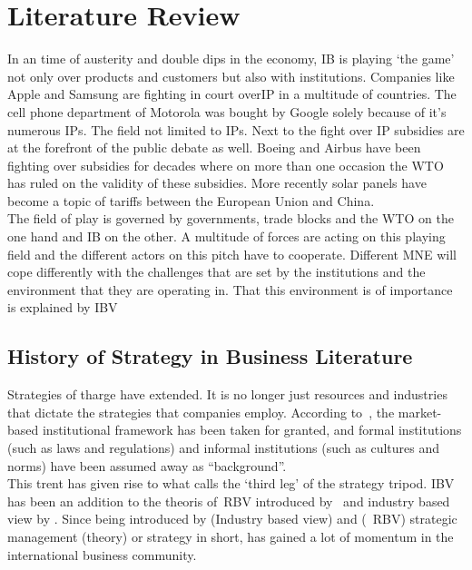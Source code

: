 \chapter{Literature Review}



In an time of austerity and double dips in the economy, \gls{IB} is playing `the game' not only over products and customers but also with institutions. Companies like Apple and Samsung are  fighting in court over\gls{IP} in a multitude of countries. The cell phone department of Motorola was bought by Google solely because of it's numerous \glspl{IP}. The field not limited to \glspl{IP}. Next to the fight over \gls{IP} subsidies are at the forefront of the public debate as well. Boeing and Airbus have been fighting over subsidies for decades where on more than one occasion the \gls{WTO} has ruled on the validity of these subsidies. More recently solar panels have become a topic of tariffs between the European Union and China. \\

The field of play is governed by governments, trade blocks and the \gls{WTO} on the one hand and \gls{IB} on the other.
A multitude of forces are acting on this playing field and the different actors on this pitch have to cooperate. 
Different \gls{MNE} will cope differently with the challenges that are set by the institutions and the environment that they are operating in. That this environment is of importance is explained by \gls{IBV}~\cite{Kostova:1999,Meyer:2009,Wang:2012} 

\section{ History of Strategy in Business Literature}

Strategies of tharge \mne have extended. It is no longer just resources and industries that dictate the strategies that companies employ. According to~\cite{Peng:2009}, the market-based institutional framework has been taken for granted, and formal institutions (such as laws and regulations) and informal institutions (such as cultures and norms) have been assumed away as ``background''.\\

This trent has given rise to what \cite{Peng:2009} calls the `third leg' of the strategy tripod. \Gls{IBV} has been an addition to the theoris of~\gls{RBV} introduced by~\cite{Barney:1991} and industry based view by \cite{Porter:1980}. 
Since being introduced by \cite{Porter:1980} (Industry based view) and \cite{Barney:1991} (~\gls{RBV}) strategic management (theory) or strategy in short, has gained a lot of momentum in the international business community. \\ 


